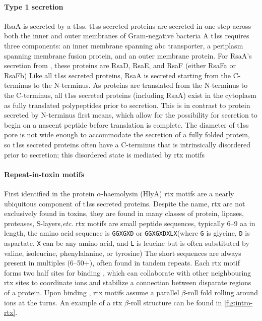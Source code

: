 \paragraph{Type 1 secretion} RsaA is secreted by a \ac{t1ss}. \Ac{t1ss} secreted proteins are secreted in one step across both the inner and outer membranes of Gram-negative bacteria A \ac{t1ss} requires three components: an inner membrane spanning \ac{abc} transporter, a periplasm spanning membrane fusion protein, and an outer membrane protein. For RsaA's secretion from \caulobacter, these proteins are RsaD, RsaE, and RsaF (either RsaFa or RsaFb) Like all \ac{t1ss} secreted proteins, RsaA is secreted starting from the C-terminus to the N-terminus. As proteins are translated from the N-terminus to the C-terminus, all \ac{t1ss} secreted proteins (including RsaA) exist in the cytoplasm as fully translated polypeptides prior to secretion. This is in contrast to protein secreted by N-terminus first means, which allow for the possibility for secretion to begin on a nascent peptide before translation is complete. The diameter of \ac{t1ss} pore is not wide enough to accommodate the secretion of a fully folded protein, so \ac{t1ss} secreted proteins often have a C-terminus that is intrinsically disordered prior to secretion; this disordered state is mediated by \ac{rtx} motifs   

  \paragraph{Repeat-in-toxin motifs} \label{sec:repeat-toxin-motifs} First identified in the \ecoli protein $\alpha$-haemolysin (HlyA) \ac{rtx} motifs are a nearly ubiquitous component of \ac{t1ss} secreted proteins. Despite the name, \acl{rtx} are not exclusively found in toxins, they are found in many classes of protein, lipases, proteases, S-layers,\textit{etc.}  \ac{rtx} motifs are small peptide sequences, typically 6--9 \ac{aa} in length, the amino acid sequence is \texttt{GGXGXD} or \texttt{GGXGXDXLX}(where \texttt{G} is glycine, \texttt{D} is aspartate, \texttt{X} can be any amino acid, and \texttt{L} is leucine but is often substituted by valine, isoleucine, phenylalanine, or tyrosine) The short sequences are always present in multiples (6--50+), often found in tandem repeats. Each \ac{rtx} motif forms two half sites for binding , which can collaborate with other neighbouring \ac{rtx} sites to coordinate ions and stabilize a connection between disparate regions of a protein. Upon binding , \ac{rtx} motifs assume a parallel $\beta$-roll fold rolling around  ions at the turns. An example of a \ac{rtx} $\beta$-roll structure can be found in \cref{fig:intro-rtx}.

